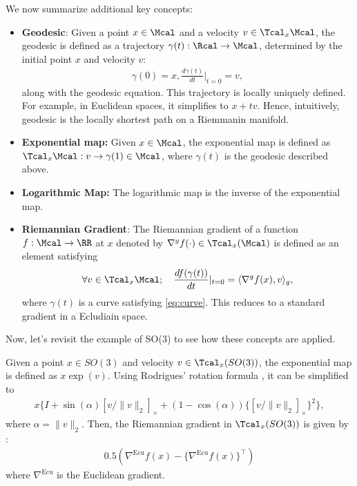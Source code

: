 We now summarize additional key concepts:
\begin{itemize}
    \item \textbf{Geodesic}: Given a point $x \in \Mcal$ and a velocity $v \in \Tcal_{x} \Mcal$, the geodesic is defined as a trajectory $\gamma(t):\Rcal \to \Mcal$, determined by the initial point $x$ and velocity $v$: 
    \begin{align}\label{eq:curve}
        \gamma(0)=x, \frac{d\gamma(t) }{dt}|_{t=0}=v, 
    \end{align}
    along with the geodesic equation. This trajectory is locally uniquely defined. For example, in Euclidean spaces, it simplifies to $x + tv$. Hence, intuitively, geodesic is the locally shortest path on a Riemmanin manifold. 
    \item \textbf{Exponential map:} Given $x \in \Mcal$, the exponential map is defined as $\Tcal_{x}\Mcal: v \to \gamma(1) \in \Mcal$, where $\gamma(t)$ is the geodesic described above.
    \item \textbf{Logarithmic Map:} The logarithmic map is the inverse of the exponential map.
    \item \textbf{Riemannian Gradient}: The Riemannian gradient of a function $f:\Mcal \to \RR$ at $x$ denoted by $\nabla^{g} f(\cdot)\in \Tcal_x(\Mcal)$ is defined as an element satisfying  
    \begin{align*} 
    \forall v\in \Tcal_{x}\Mcal;\quad \frac{df(\gamma(t))}{dt}|_{{t=0}} = \langle \nabla^{g} f(x),v\rangle_{g}, 
    \end{align*} 
    where $\gamma(t)$ is a curve satisfying \eqref{eq:curve}. This reduces to a standard gradient in a Ecludiain space. 
\end{itemize}


Now, let’s revisit the example of SO(3) to see how these concepts are applied.



\begin{Exabox}{}
\addtocounter{example}{-1}
\begin{example}[continued]
Given a point $x \in SO(3)$ and velocity $v \in \Tcal_{x}(SO(3))$, the exponential map is defined as $x\exp(v)$. Using Rodrigues' rotation formula \citep{lee2018introduction}, it can be simplified to 
{ \begin{align*}
      x\{I + \sin(\alpha)[v/\|v\|_2 ]_{\times} +(1-\cos(\alpha))\{[v/\|v\|_2]_{\times}\}^2  \}, 
\end{align*}
} 
where $\alpha = \|v\|_2$. Then, the Riemannian gradient in $\Tcal_{x}(SO(3))$ is given by :
\begin{align}\label{eq:gradient}
    0.5(\nabla^{\mathrm{Ecu}} f(x) - \{\nabla^{\mathrm{Ecu}} f(x)\}^{\top})  
\end{align}
where $\nabla^{\mathrm{Ecu}}$  is the Euclidean gradient. 
\end{example}
\end{Exabox}

